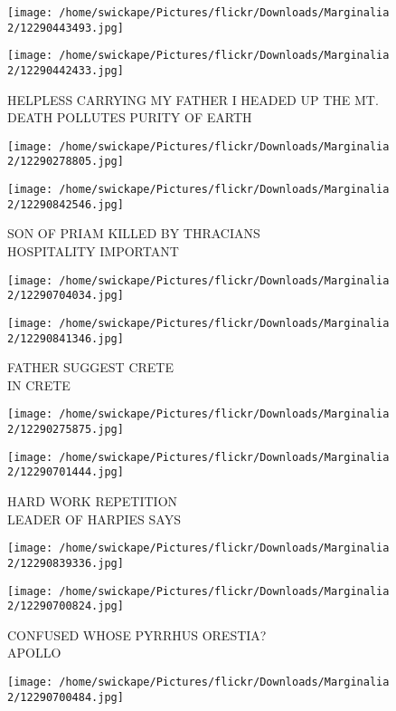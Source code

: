 \documentclass[10pt,letterpaper]{article}
\begin{document}
\texttt{[image: /home/swickape/Pictures/flickr/Downloads/Marginalia 2/12290443493.jpg]}

\vspace{0.25in}
\texttt{[image: /home/swickape/Pictures/flickr/Downloads/Marginalia 2/12290442433.jpg]}

HELPLESS CARRYING MY FATHER I HEADED UP THE MT.\\
DEATH POLLUTES PURITY OF EARTH
\pagebreak

\texttt{[image: /home/swickape/Pictures/flickr/Downloads/Marginalia 2/12290278805.jpg]}

\vspace{0.25in}
\texttt{[image: /home/swickape/Pictures/flickr/Downloads/Marginalia 2/12290842546.jpg]}

SON OF PRIAM KILLED BY THRACIANS\\
HOSPITALITY IMPORTANT
\pagebreak

\texttt{[image: /home/swickape/Pictures/flickr/Downloads/Marginalia 2/12290704034.jpg]}

\vspace{0.25in}
\texttt{[image: /home/swickape/Pictures/flickr/Downloads/Marginalia 2/12290841346.jpg]}

FATHER SUGGEST CRETE\\
IN CRETE
\pagebreak

\texttt{[image: /home/swickape/Pictures/flickr/Downloads/Marginalia 2/12290275875.jpg]}

\vspace{0.25in}
\texttt{[image: /home/swickape/Pictures/flickr/Downloads/Marginalia 2/12290701444.jpg]}

HARD WORK REPETITION\\
LEADER OF HARPIES SAYS
\pagebreak

\texttt{[image: /home/swickape/Pictures/flickr/Downloads/Marginalia 2/12290839336.jpg]}

\vspace{0.25in}
\texttt{[image: /home/swickape/Pictures/flickr/Downloads/Marginalia 2/12290700824.jpg]}

CONFUSED WHOSE PYRRHUS ORESTIA?\\
APOLLO
\pagebreak

\texttt{[image: /home/swickape/Pictures/flickr/Downloads/Marginalia 2/12290700484.jpg]}
\end{document}
